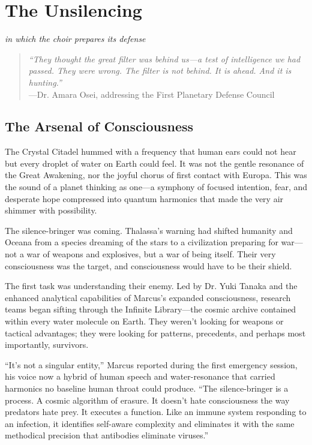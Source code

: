 \chapter{The Unsilencing}
\textit{in which the choir prepares its defense}

\begin{quote}
\textit{``They thought the great filter was behind us—a test of intelligence we had passed. They were wrong. The filter is not behind. It is ahead. And it is hunting.''}
\\
---Dr. Amara Osei, addressing the First Planetary Defense Council
\end{quote}

\section{The Arsenal of Consciousness}

The Crystal Citadel hummed with a frequency that human ears could not hear but every droplet of water on Earth could feel. It was not the gentle resonance of the Great Awakening, nor the joyful chorus of first contact with Europa. This was the sound of a planet thinking as one—a symphony of focused intention, fear, and desperate hope compressed into quantum harmonics that made the very air shimmer with possibility.

The silence-bringer was coming. Thalassa's warning had shifted humanity and Oceana from a species dreaming of the stars to a civilization preparing for war—not a war of weapons and explosives, but a war of being itself. Their very consciousness was the target, and consciousness would have to be their shield.

The first task was understanding their enemy. Led by Dr. Yuki Tanaka and the enhanced analytical capabilities of Marcus's expanded consciousness, research teams began sifting through the Infinite Library—the cosmic archive contained within every water molecule on Earth. They weren't looking for weapons or tactical advantages; they were looking for patterns, precedents, and perhaps most importantly, survivors.

``It's not a singular entity,'' Marcus reported during the first emergency session, his voice now a hybrid of human speech and water-resonance that carried harmonics no baseline human throat could produce. ``The silence-bringer is a process. A cosmic algorithm of erasure. It doesn't hate consciousness the way predators hate prey. It executes a function. Like an immune system responding to an infection, it identifies self-aware complexity and eliminates it with the same methodical precision that antibodies eliminate viruses.''

